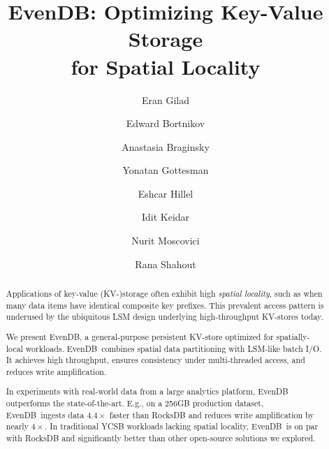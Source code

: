 \documentclass[sigplan,10pt]{acmart}
\date{}
\newcommand{\inred}[1]{{\color{red}{#1}}}
\newcommand{\sys}{EvenDB}
\begin{document}
\title[\sys: Key-Value Storage for Spatial Locality]{\sys: Optimizing Key-Value Storage\\ for Spatial Locality} 

\author{Eran Gilad}


\author{Edward Bortnikov}

\author{Anastasia Braginsky}


\author{Yonatan Gottesman}


\author{Eshcar Hillel}

\author{Idit Keidar}

\author{Nurit Moscovici}

\author{Rana Shahout}

\begin{abstract}
Applications of key-value (KV-)storage often exhibit high \emph{spatial locality}, such as  
when many data items have identical composite key prefixes.  
This prevalent access pattern is underused by the ubiquitous LSM  design underlying 
high-throughput KV-stores today.

We present \sys, a general-purpose persistent KV-store optimized for spatially-local %
workloads. 
\sys\ combines spatial data partitioning with LSM-like  batch I/O. 
It achieves high throughput, 
ensures consistency under multi-threaded access,   
and reduces write amplification. 

In experiments with real-world data from a large analytics platform,  \sys\  
outperforms the state-of-the-art. E.g., on a 256GB production dataset, 
\sys\ ingests data $4.4\times$ faster than RocksDB  %
and reduces write amplification by nearly $4\times$. 
In traditional YCSB workloads lacking spatial locality, %
\sys\ is on par with RocksDB and significantly better than other open-source solutions we explored.

\end{abstract}
\end{document}
